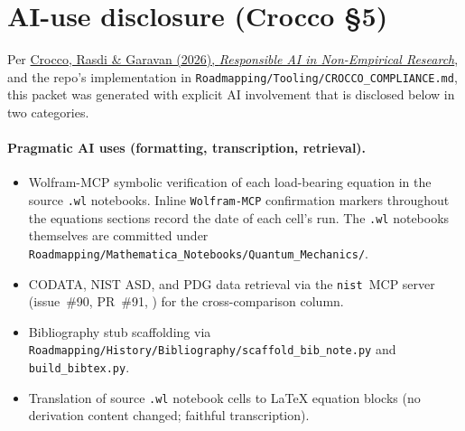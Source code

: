 \section{AI-use disclosure (Crocco \S5)}
\label{sec:ai-use-disclosure}

Per
\href{https://doi.org/10.1177/15344843261445531}{Crocco, Rasdi \& Garavan
(2026), \emph{Responsible AI in Non-Empirical Research}}, and the repo's
implementation in
\texttt{Roadmapping/Tooling/CROCCO\_COMPLIANCE.md}, this packet was generated
with explicit AI involvement that is disclosed below in two categories.

\paragraph{Pragmatic AI uses (formatting, transcription, retrieval).}
\begin{itemize}[topsep=2pt,itemsep=0pt]
  \item Wolfram-MCP symbolic verification of each load-bearing equation in
        the source \texttt{.wl} notebooks. Inline \texttt{Wolfram-MCP}
        confirmation markers throughout the equations sections record the
        date of each cell's run. The \texttt{.wl} notebooks themselves are
        committed under
        \texttt{Roadmapping/Mathematica\_Notebooks/Quantum\_Mechanics/}.
  \item CODATA, NIST ASD, and PDG data retrieval via the \texttt{nist}~MCP
        server (issue~\#90, PR~\#91, \cite{nist_mcp_pr91}) for the
        cross-comparison column.
  \item Bibliography stub scaffolding via
        \texttt{Roadmapping/History/Bibliography/scaffold\_bib\_note.py}
        and \texttt{build\_bibtex.py}.
  \item Translation of source \texttt{.wl} notebook cells to LaTeX equation
        blocks (no derivation content changed; faithful transcription).
\end{itemize}

